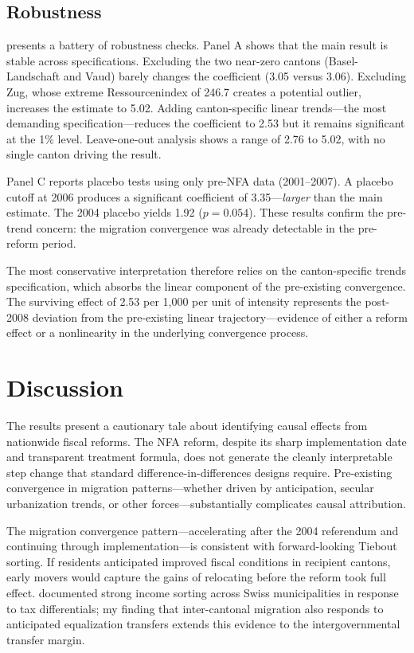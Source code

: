 \documentclass[12pt]{article}
\begin{document}
\subsection{Robustness}



 presents a battery of robustness checks. Panel A shows that the main result is stable across specifications. Excluding the two near-zero cantons (Basel-Landschaft and Vaud) barely changes the coefficient (3.05 versus 3.06). Excluding Zug, whose extreme Ressourcenindex of 246.7 creates a potential outlier, increases the estimate to 5.02. Adding canton-specific linear trends---the most demanding specification---reduces the coefficient to 2.53 but it remains significant at the 1\% level. Leave-one-out analysis shows a range of 2.76 to 5.02, with no single canton driving the result.

Panel C reports placebo tests using only pre-NFA data (2001--2007). A placebo cutoff at 2006 produces a significant coefficient of 3.35---\textit{larger} than the main estimate. The 2004 placebo yields 1.92 ($p = 0.054$). These results confirm the pre-trend concern: the migration convergence was already detectable in the pre-reform period.

The most conservative interpretation therefore relies on the canton-specific trends specification, which absorbs the linear component of the pre-existing convergence. The surviving effect of 2.53 per 1,000 per unit of intensity represents the post-2008 deviation from the pre-existing linear trajectory---evidence of either a reform effect or a nonlinearity in the underlying convergence process.

\section{Discussion}

The results present a cautionary tale about identifying causal effects from nationwide fiscal reforms. The NFA reform, despite its sharp implementation date and transparent treatment formula, does not generate the cleanly interpretable step change that standard difference-in-differences designs require. Pre-existing convergence in migration patterns---whether driven by anticipation, secular urbanization trends, or other forces---substantially complicates causal attribution.

The migration convergence pattern---accelerating after the 2004 referendum and continuing through implementation---is consistent with forward-looking Tiebout sorting. If residents anticipated improved fiscal conditions in recipient cantons, early movers would capture the gains of relocating before the reform took full effect. \citet{Schmidheiny2006} documented strong income sorting across Swiss municipalities in response to tax differentials; my finding that inter-cantonal migration also responds to anticipated equalization transfers extends this evidence to the intergovernmental transfer margin.
\end{document}
